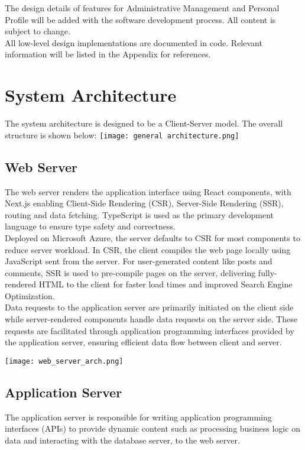 \documentclass[11pt, a4paper]{article}
\begin{document}
The design details of features for Administrative Management and Personal Profile will be added with the software development process. All content is subject to change. \\

All low-level design implementations are documented in code. Relevant information will be listed in the Appendix for references.

\section{System Architecture}
The system architecture is designed to be a Client-Server model. The overall structure is shown below:
\texttt{[image: general architecture.png]}

\subsection{Web Server}
The web server renders the application interface using React components, with Next.js enabling Client-Side Rendering (CSR), Server-Side Rendering (SSR), routing and data fetching. TypeScript is used as the primary development language to ensure type safety and correctness.\\

Deployed on Microsoft Azure, the server defaults to CSR for most components to reduce server workload. In CSR, the client compiles the web page locally using JavaScript sent from the server. For user-generated content like posts and comments, SSR is used to pre-compile pages on the server, delivering fully-rendered HTML to the client for faster load times and improved Search Engine Optimization.\\

Data requests to the application server are primarily initiated on the client side while server-rendered components handle data requests on the server side. These requests are facilitated through application programming interfaces provided by the application server, ensuring efficient data flow between client and server.\\

\begin{center}
\texttt{[image: web\_server\_arch.png]}
\end{center}

\subsection{Application Server}
The application server is responsible for writing application programming interfaces (APIs) to provide dynamic content such as processing business logic on data and interacting with the database server, to the web server.\\
\end{document}
